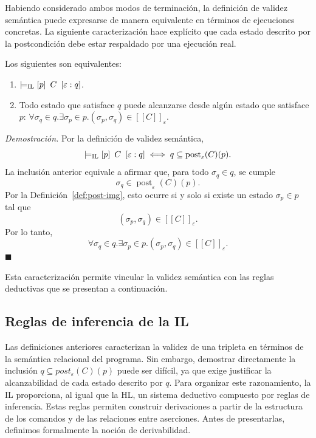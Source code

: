\documentclass[a4paper,	11pt]{report}
\begin{document}
Habiendo considerado ambos modos de terminación,
la definición de validez semántica puede expresarse de manera equivalente en términos de ejecuciones concretas.
La siguiente caracterización hace explícito que cada estado descrito por la postcondición debe estar respaldado por una ejecución real.

\begin{lema}[Caracterización]
\label{lem:caracterizacion}
Los siguientes son equivalentes:
\begin{enumerate}
  \item $\models_{\mathrm{IL}} \left\lbrack p \right\rbrack~C~\left\lbrack \varepsilon : q \right\rbrack$.
  \item Todo estado que satisface $q$ puede alcanzarse desde algún estado que satisface $p$:
  $\forall \sigma_q \in q. \exists \sigma_p \in p. (\sigma_p, \sigma_q) \in [\![C]\!]_\varepsilon$.
\end{enumerate}
\end{lema}
\emph{Demostración.} Por la definición de validez semántica,
$$\models_{\mathrm{IL}} \left\lbrack p \right\rbrack~C~\left\lbrack \varepsilon : q \right\rbrack \iff q \subseteq \operatorname{post}_\varepsilon(C)(p).$$
La inclusión anterior equivale a afirmar que,
para todo $\sigma_q \in q$, se cumple
$$\sigma_q \in \operatorname{post}_\varepsilon(C)(p).$$
Por la Definición~\ref{def:post-img},
esto ocurre si y solo si existe un estado $\sigma_p \in p$ tal que
$$(\sigma_p, \sigma_q) \in [\![C]\!]_\varepsilon.$$
Por lo tanto,
$$\forall \sigma_q \in q. \exists \sigma_p \in p. (\sigma_p, \sigma_q) \in [\![C]\!]_\varepsilon.$$
$\ensuremath{\blacksquare}$

Esta caracterización permite vincular la validez semántica con las reglas deductivas que se presentan a continuación.

\subsection*{Reglas de inferencia de la IL}
Las definiciones anteriores caracterizan la validez de una tripleta en términos de la semántica relacional del programa.
Sin embargo, demostrar directamente la inclusión $q \subseteq post_\varepsilon(C)(p)$ puede ser difícil,
ya que exige justificar la alcanzabilidad de cada estado descrito por $q$.
Para organizar este razonamiento,
la IL proporciona,
al igual que la HL,
un sistema deductivo compuesto por reglas de inferencia.
Estas reglas permiten construir derivaciones a partir de la estructura de los comandos y de las relaciones entre aserciones.
Antes de presentarlas, definimos formalmente la noción de derivabilidad.
\end{document}
